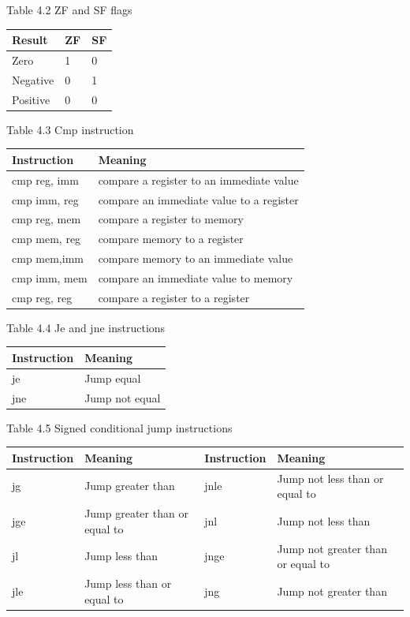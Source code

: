 \documentclass[10pt]{article}
\begin{document}
Table 4.2 ZF and SF flags

\begin{center}
\begin{tabular}{|l|l|l|}
\hline
Result & ZF & SF \\
\hline
Zero & 1 & 0 \\
\hline
Negative & 0 & 1 \\
\hline
Positive & 0 & 0 \\
\hline
\end{tabular}
\end{center}

Table 4.3 Cmp instruction

\begin{center}
\begin{tabular}{|l|l|}
\hline
Instruction & Meaning \\
\hline
cmp reg, imm & compare a register to an immediate value \\
\hline
cmp imm, reg & compare an immediate value to a register \\
\hline
cmp reg, mem & compare a register to memory \\
\hline
cmp mem, reg & compare memory to a register \\
\hline
cmp mem,imm & compare memory to an immediate value \\
\hline
cmp imm, mem & compare an immediate value to memory \\
\hline
cmp reg, reg & compare a register to a register \\
\hline
\end{tabular}
\end{center}

Table 4.4 Je and jne instructions

\begin{center}
\begin{tabular}{|l|l|}
\hline
Instruction & Meaning \\
\hline
je & Jump equal \\
\hline
jne & Jump not equal \\
\hline
\end{tabular}
\end{center}

Table 4.5 Signed conditional jump instructions

\begin{center}
\begin{tabular}{|l|l|l|l|}
\hline
Instruction & Meaning & Instruction & Meaning \\
\hline
jg & Jump greater than & jnle & Jump not less than or equal to \\
\hline
jge & Jump greater than or equal to & jnl & Jump not less than \\
\hline
jl & Jump less than & jnge & Jump not greater than or equal to \\
jle & Jump less than or equal to & jng & Jump not greater than \\
\hline
\end{tabular}
\end{center}
\end{document}

